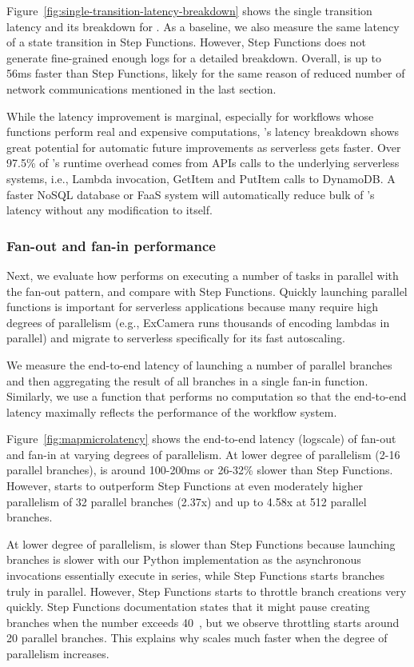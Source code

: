 Figure~\ref{fig:single-transition-latency-breakdown} shows the single transition
latency and its breakdown for \name{}. As a baseline, we also measure the same
latency of a state transition in Step Functions. However, Step Functions does
not generate fine-grained enough logs for a detailed breakdown. Overall,
\name{} is up to 56ms faster than Step Functions, likely for the same reason
of reduced number of network communications mentioned in the last section.

While the latency improvement is marginal, especially for workflows whose
functions perform real and expensive computations, \name{}'s latency breakdown
shows great potential for automatic future improvements as serverless gets
faster. Over 97.5\% of \name{}'s runtime overhead comes from APIs calls to the
underlying serverless systems, i.e., Lambda invocation, GetItem and PutItem
calls to DynamoDB. A faster NoSQL database or FaaS system will automatically
reduce bulk of \name{}'s latency without any modification to \name{} itself.


\subsubsection{Fan-out and fan-in performance}\label{sec:eval:fan-out}

Next, we evaluate how \name{} performs on executing a number of tasks in
parallel with the fan-out pattern, and compare with Step Functions. Quickly
launching parallel functions is important for serverless applications because
many require high degrees of parallelism (e.g., ExCamera runs thousands of
encoding lambdas in parallel) and migrate to serverless specifically for its
fast autoscaling.

We measure the end-to-end latency of launching a number of parallel branches
and then aggregating the result of all branches in a single fan-in function.
Similarly, we use a function that performs no computation so that the
end-to-end latency maximally reflects the performance of the workflow system.


Figure~\ref{fig:mapmicrolatency} shows the end-to-end latency (logscale) of
fan-out and fan-in at varying degrees of parallelism. At lower degree of
parallelism (2-16 parallel branches), \name{} is around 100-200ms or 26-32\%
slower than Step Functions. However, \name{} starts to outperform Step
Functions at even moderately higher parallelism of 32 parallel branches
(2.37x) and up to 4.58x at 512 parallel branches.

At lower degree of parallelism, \name{} is slower than Step Functions because
launching branches is slower with our Python implementation as the
asynchronous invocations essentially execute in series, while Step Functions
starts branches truly in parallel. However, Step Functions starts to throttle
branch creations very quickly. Step Functions documentation states that it
might pause creating branches when the number exceeds
40~\cite{aws-step-functions-map-state}, but we observe throttling starts
around 20 parallel branches. This explains why \name{} scales much faster when
the degree of parallelism increases.

